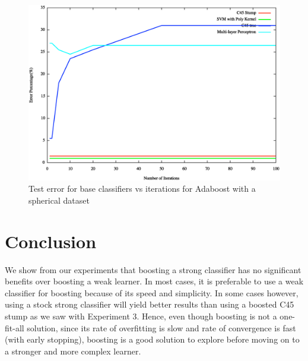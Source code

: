 \documentclass[letterpaper,11pt]{article}
\begin{document}
\begin{figure}[H]
  \centering
  \includegraphics[width=140mm]{modelVsAccuracy-test-spherical.eps}
  \caption{Test error for base classifiers vs iterations for Adaboost with a spherical dataset}
  \label{fig:modelVsAccuracytestspherical}
\end{figure}

\section{Conclusion}
We show from our experiments that boosting a strong classifier has no significant benefits over boosting a weak learner. In most cases, it is preferable to use a weak classifier for boosting because of its speed and simplicity. In some cases however, using a stock strong classifier will yield better results than using a boosted C45 stump as we saw with Experiment 3. Hence, even though boosting is not a one-fit-all solution, since its rate of overfitting is slow and rate of convergence is fast (with early stopping), boosting is a good solution to explore before moving on to a stronger and more complex learner. 

\end{document}
